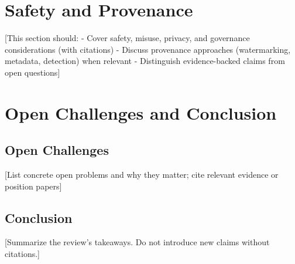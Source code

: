 \documentclass[conference]{IEEEtran}
\begin{document}
\section{Safety and Provenance}
[This section should:
- Cover safety, misuse, privacy, and governance considerations (with citations)
- Discuss provenance approaches (watermarking, metadata, detection) when relevant
- Distinguish evidence-backed claims from open questions]

\section{Open Challenges and Conclusion}
\subsection{Open Challenges}
[List concrete open problems and why they matter; cite relevant evidence or position papers]

\subsection{Conclusion}
[Summarize the review's takeaways. Do not introduce new claims without citations.]

  
\end{document}
